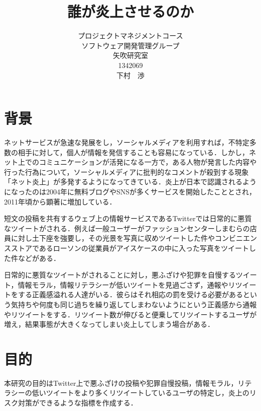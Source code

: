 \title{誰が炎上させるのか}
\author{プロジェクトマネジメントコース\\
ソフトウェア開発管理グループ\\
矢吹研究室\\	
1342069\\
下村　渉}
\date{}

\maketitle



\tableofcontents%





\chapter{背景}
ネットサービスが急速な発展をし，ソーシャルメディアを利用すれば，不特定多数の相手に対して，個人が情報を発信することも容易になっている．しかし，ネット上でのコミュニケーションが活発になる一方で，ある人物が発言した内容や行った行為について，ソーシャルメディアに批判的なコメントが殺到する現象「ネット炎上」が多発するようになってきている\cite{a}．炎上が日本で認識されるようになったのは2004年に無料ブログやSNSが多くサービスを開始したこととされ，2011年頃から顕著に増加している\cite{b}．

 短文の投稿を共有するウェブ上の情報サービスであるTwitterでは日常的に悪質なツイートがされる．例えば一般ユーザーがファッションセンターしまむらの店員に対し土下座を強要し，その光景を写真に収めツイートした件やコンビニエンスストアであるローソンの従業員がアイスケースの中に入った写真をツイートした件などがある．

日常的に悪質なツイートがされることに対し，悪ふざけや犯罪を自慢するツイート，情報モラル，情報リテラシーが低いツイートを見過ごさず，通報やリツイートをする正義感溢れる人達がいる．彼らはそれ相応の罰を受ける必要があるという気持ちや何度も同じ過ちを繰り返してしまわないようにという正義感から通報やリツイートをする．リツイート数が伸びると便乗してリツイートするユーザが増え，結果事態が大きくなってしまい炎上してしまう場合がある．
 
\chapter{目的}
本研究の目的はTwitter上で悪ふざけの投稿や犯罪自慢投稿，情報モラル，リテラシーの低いツイートをより多くリツイートしているユーザの特定し，炎上のリスク対策ができるような指標を作成する．
